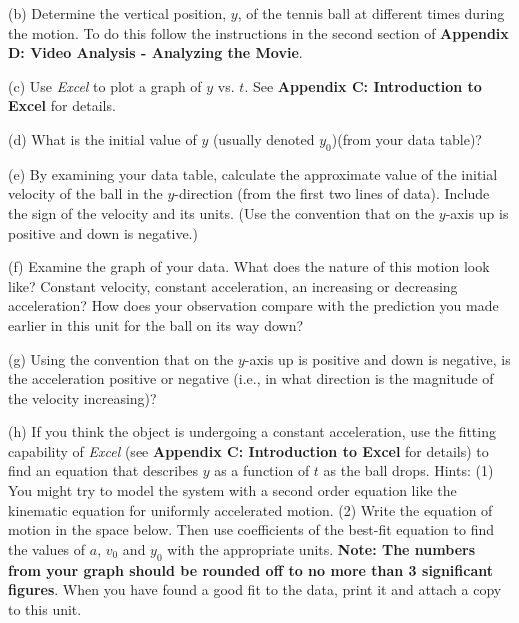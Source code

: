(b) Determine the vertical position, $y$, of the tennis ball at different times
during the motion. To do this follow the instructions in the second section of \textbf{Appendix D: Video Analysis - Analyzing the Movie}. 

(c) Use \textit{Excel} to plot a graph of $y$ vs. $t$. See \textbf{Appendix
C: Introduction to Excel} for details.

(d) What is the initial value of $y$ (usually denoted \( y_{0} \))(from your data table)? 
\vspace{10mm}

(e) By examining your data table, calculate the approximate value of the initial velocity of the ball in the $y$-direction (from the first two lines of data). Include the sign of the velocity and its units. (Use the convention that on the $y$-axis up is positive and down is negative.)
\vspace{20mm}

(f) Examine the graph of your data. What does the nature of this motion look
like? Constant velocity, constant acceleration, an increasing or decreasing
acceleration? How does your observation compare with the prediction you made
earlier in this unit for the ball on its way down?
\vspace{20mm}

(g) Using the convention that on the $y$-axis up is positive and down is negative, is the acceleration positive or negative (i.e., in what direction is the magnitude of the velocity increasing)?
\vspace{20mm}

(h) If you think the object is undergoing a constant acceleration, use the fitting capability of \textit{Excel} (see \textbf{Appendix C: Introduction to
Excel} for details) to find an equation that describes $y$ as a function
of $t$ as the ball drops. Hints: (1) You might try to model the system with a
second order equation like the kinematic equation for uniformly accelerated
motion. (2) Write the equation of motion in the space below. Then use coefficients of the best-fit equation to find the values of $a$, \( v_{0} \) and \( y_{0} \) with the appropriate units. \textbf{Note: The numbers from your graph should be rounded off to no more than 3 significant figures}. When you have found a good fit to the data, print it and attach a copy to this unit. 

